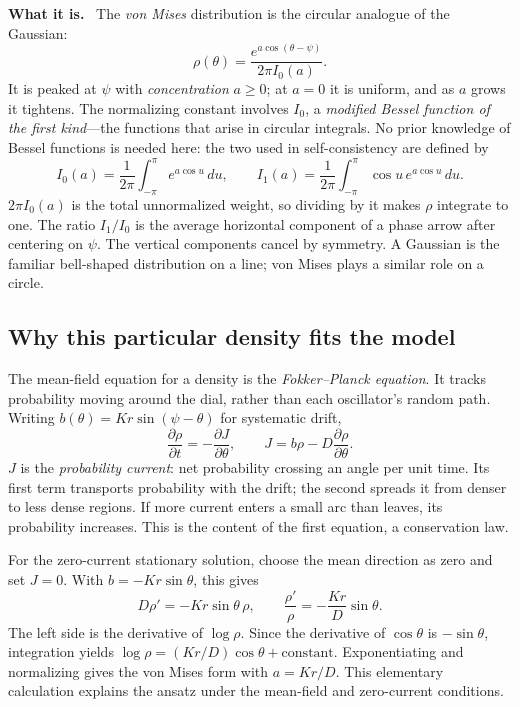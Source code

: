 \documentclass[11pt]{article}
\newcommand{\what}{\par\smallskip\noindent\textbf{What it is.}\ }
\begin{document}
\what
The \emph{von Mises} distribution is the circular analogue of the Gaussian:
\[
 \rho(\theta)=\frac{e^{a\cos(\theta-\psi)}}{2\pi I_0(a)} .
\]
It is peaked at $\psi$ with \emph{concentration} $a\ge0$; at $a=0$ it is
uniform, and as $a$ grows it tightens. The normalizing constant involves
$I_0$, a \emph{modified Bessel function of the first kind}---the functions that
arise in circular integrals. No prior knowledge of Bessel functions is needed
here: the two used in self-consistency are defined by
\[
 I_0(a)=\frac1{2\pi}\int_{-\pi}^{\pi}e^{a\cos u}\,du,\qquad
 I_1(a)=\frac1{2\pi}\int_{-\pi}^{\pi}\cos u\,e^{a\cos u}\,du.
\]
$2\pi I_0(a)$ is the total unnormalized weight, so dividing by it makes
$\rho$ integrate to one. The ratio $I_1/I_0$ is the average horizontal
component of a phase arrow after centering on $\psi$. The vertical components
cancel by symmetry. A Gaussian is the familiar bell-shaped distribution on
a line; von Mises plays a similar role on a circle.

\subsection{Why this particular density fits the model}

The mean-field equation for a density is the \emph{Fokker--Planck equation}.
It tracks probability moving around the dial, rather than each oscillator's
random path. Writing $b(\theta)=Kr\sin(\psi-\theta)$ for systematic drift,
\[
 \frac{\partial\rho}{\partial t}
 =-\frac{\partial J}{\partial\theta},\qquad
 J=b\rho-D\frac{\partial\rho}{\partial\theta}.
\]
$J$ is the \emph{probability current}: net probability crossing an angle per
unit time. Its first term transports probability with the drift; the second
spreads it from denser to less dense regions. If more current enters a small
arc than leaves, its probability increases. This is the content of the first
equation, a conservation law.

For the zero-current stationary solution, choose the mean direction as zero
and set $J=0$. With $b=-Kr\sin\theta$, this gives
\[
 D\rho'=-Kr\sin\theta\,\rho,
 \qquad
 \frac{\rho'}{\rho}=-\frac{Kr}{D}\sin\theta.
\]
The left side is the derivative of $\log\rho$. Since the derivative of
$\cos\theta$ is $-\sin\theta$, integration yields
$\log\rho=(Kr/D)\cos\theta+\text{constant}$. Exponentiating and normalizing
gives the von Mises form with $a=Kr/D$. This elementary calculation explains
the ansatz under the mean-field and zero-current conditions.
\end{document}
